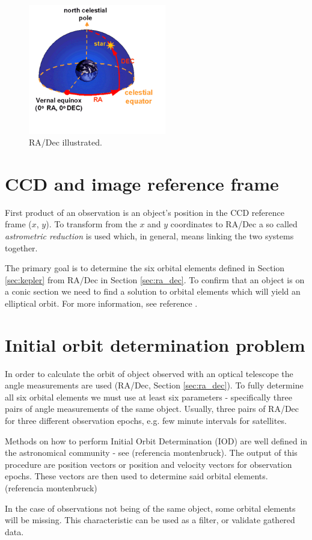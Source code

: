	\begin{figure}[H]
	\centering
	  \includegraphics[width=6cm]{images/equatorial}
		  \caption{RA/Dec illustrated.}
	  \label{fig:equatorial}
	\end{figure}

\section{CCD and image reference frame}\label{sec:ccd}

	First product of an observation is an object's position in the CCD reference frame ($x$, $y$). To transform from the $x$ and $y$ coordinates to RA/Dec a so called \emph{astrometric reduction} is used which, in general, means linking the two systems together.
	
	The primary goal is to determine the six orbital elements defined in Section \ref{sec:kepler} from RA/Dec in Section \ref{sec:ra_dec}. To confirm that an object is on a conic section we need to find a solution to orbital elements which will yield an elliptical orbit. For more information, see reference .
	
\section{Initial orbit determination problem}\label{sec:init_orbit_det}
	
	In order to calculate the orbit of object observed with an optical telescope the angle measurements are used (RA/Dec, Section \ref{sec:ra_dec}). To fully determine all six orbital elements we must use at least six parameters - specifically three pairs of angle measurements of the same object. Usually, three pairs of RA/Dec for three different observation epochs, e.g. few minute intervals for satellites. 	
	
	Methods on how to perform Initial Orbit Determination (IOD) are well defined in the astronomical community - see (referencia montenbruck). The output of this procedure are position vectors or position and velocity vectors for observation epochs. These vectors are then used to determine said orbital elements. (referencia montenbruck)
	
	In the case of observations not being of the same object, some orbital elements will be missing. This characteristic can be used as a filter, or validate gathered data.